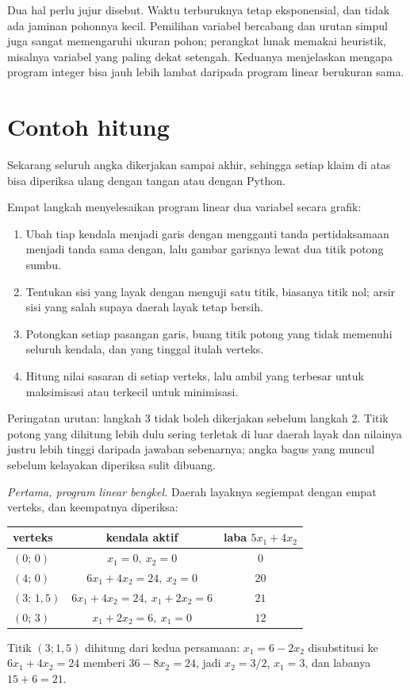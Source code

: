 Dua hal perlu jujur disebut. Waktu terburuknya tetap eksponensial, dan tidak ada
jaminan pohonnya kecil. Pemilihan variabel bercabang dan urutan simpul juga sangat
memengaruhi ukuran pohon; perangkat lunak memakai heuristik, misalnya variabel yang paling
dekat setengah. Keduanya menjelaskan mengapa program integer bisa jauh lebih lambat daripada
program linear berukuran sama.

\section{Contoh hitung}

Sekarang seluruh angka dikerjakan sampai akhir, sehingga setiap klaim di atas bisa
diperiksa ulang dengan tangan atau dengan Python.

\begin{resep}
Empat langkah menyelesaikan program linear dua variabel secara grafik:
\begin{enumerate}
  \item Ubah tiap kendala menjadi garis dengan mengganti tanda pertidaksamaan menjadi tanda
        sama dengan, lalu gambar garisnya lewat dua titik potong sumbu.
  \item Tentukan sisi yang layak dengan menguji satu titik, biasanya titik nol; arsir sisi
        yang salah supaya daerah layak tetap bersih.
  \item Potongkan setiap pasangan garis, buang titik potong yang tidak memenuhi seluruh
        kendala, dan yang tinggal itulah verteks.
  \item Hitung nilai sasaran di setiap verteks, lalu ambil yang terbesar untuk maksimisasi
        atau terkecil untuk minimisasi.
\end{enumerate}
Peringatan urutan: langkah 3 tidak boleh dikerjakan sebelum langkah 2. Titik potong yang
dihitung lebih dulu sering terletak di luar daerah layak dan nilainya justru lebih tinggi
daripada jawaban sebenarnya; angka bagus yang muncul sebelum kelayakan diperiksa sulit
dibuang.
\end{resep}

\emph{Pertama, program linear bengkel.} Daerah layaknya segiempat dengan empat verteks,
dan keempatnya diperiksa:
\begin{center}
\begin{tabular}{lcc}
\hline
verteks & kendala aktif & laba $5x_{1}+4x_{2}$ \\
\hline
$(0;\,0)$ & $x_{1}=0,\ x_{2}=0$ & $0$ \\
$(4;\,0)$ & $6x_{1}+4x_{2}=24,\ x_{2}=0$ & $20$ \\
$(3;\,1{,}5)$ & $6x_{1}+4x_{2}=24,\ x_{1}+2x_{2}=6$ & $21$ \\
$(0;\,3)$ & $x_{1}+2x_{2}=6,\ x_{1}=0$ & $12$ \\
\hline
\end{tabular}
\end{center}
Titik $(3;1{,}5)$ dihitung dari kedua persamaan: $x_{1}=6-2x_{2}$ disubstitusi ke
$6x_{1}+4x_{2}=24$ memberi $36-8x_{2}=24$, jadi $x_{2}=3/2$, $x_{1}=3$, dan labanya
$15+6=21$.

